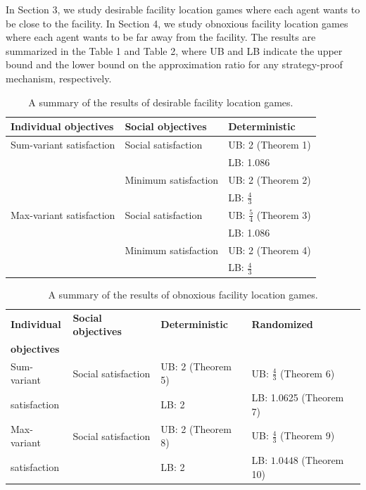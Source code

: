 \documentclass[runningheads]{11llncst}
\begin{document}
In Section 3, we study desirable facility location games where each agent wants to be close to the facility. In Section 4, we study obnoxious facility location games  where each agent wants to be far away from the facility. The results  are summarized in the  Table 1 and Table 2,  where UB and LB indicate the upper bound and the lower bound on the approximation ratio for any strategy-proof mechanism, respectively. 


\begin{table}
\caption{A summary of the results of  desirable facility location games.}\label{tab2}
\centering
\begin{tabularx}{\textwidth}{|X|X|X|}
\hline
  \textbf{Individual objectives} &\textbf{Social objectives} &\textbf{Deterministic}\\
\hline
 Sum-variant satisfaction  & Social satisfaction &   UB: 2 (Theorem 1) \\
     &  & LB: 1.086 \cite{mei2019facility}\\
    &  Minimum satisfaction  & UB: 2 (Theorem 2) \\
 & &  LB: $\frac{4}{3}$ \cite{mei2019facility}\\
  Max-variant satisfaction & Social satisfaction  & UB: $\frac{5}{4}$ (Theorem 3)  \\
 & & LB: 1.086 \cite{mei2019facility}\\  

 &  Minimum satisfaction  & UB: 2 (Theorem 4) \\
 &  & LB: $\frac{4}{3}$ \cite{mei2019facility}\\
\hline
\end{tabularx}
\end{table}

\vspace{-0.8cm}

\begin{table}
\caption{A summary of the  results of obnoxious facility location games.}
\centering

\begin{tabularx}{\textwidth}{|l|X|l|l|}
\hline%
 \textbf{Individual } &\textbf{Social objectives} & \textbf{Deterministic} &\textbf{Randomized} \\
  \textbf{ objectives} & &  & \\
\hline

 Sum-variant  & Social satisfaction & UB: 2 (Theorem 5) & UB: $\frac{4}{3}$  (Theorem 6) \\
    satisfaction &   & LB: 2 \cite{mei2019facility}  & LB: 1.0625 (Theorem 7)  \\
    Max-variant  & Social satisfaction & UB: 2 (Theorem 8) & UB:  $\frac{4}{3}$ (Theorem 9)\\
    satisfaction   & & LB: 2 \cite{mei2019facility} & LB: $1.0448$ (Theorem 10)\\
\hline
\end{tabularx}

\end{table}
\end{document}
